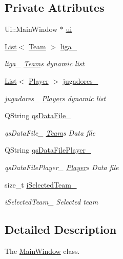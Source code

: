 \subsection*{Private Attributes}
\begin{DoxyCompactItemize}
\item 
Ui\+::\+Main\+Window $\ast$ \hyperlink{class_main_window_a35466a70ed47252a0191168126a352a5}{ui}
\item 
\hyperlink{class_list}{List}$<$ \hyperlink{class_team}{Team} $>$ \hyperlink{class_main_window_a5358b34e5fbb97d75dc06c61e7ae50fb}{liga\+\_\+}
\begin{DoxyCompactList}\small\item\em liga\+\_\+ \hyperlink{class_team}{Team}\textquotesingle{}s dynamic list \end{DoxyCompactList}\item 
\hyperlink{class_list}{List}$<$ \hyperlink{class_player}{Player} $>$ \hyperlink{class_main_window_aa0bb31955571995d85c4d9fda8bc9bbb}{jugadores\+\_\+}
\begin{DoxyCompactList}\small\item\em jugadores\+\_\+ \hyperlink{class_player}{Player}\textquotesingle{}s dynamic list \end{DoxyCompactList}\item 
Q\+String \hyperlink{class_main_window_accae73696fc981f52f13a1e51b411ccb}{qs\+Data\+File\+\_\+}
\begin{DoxyCompactList}\small\item\em qs\+Data\+File\+\_\+ \hyperlink{class_team}{Team}\textquotesingle{}s Data file \end{DoxyCompactList}\item 
Q\+String \hyperlink{class_main_window_aa4336777565d0c2a9ad6f0b96bc4c004}{qs\+Data\+File\+Player\+\_\+}
\begin{DoxyCompactList}\small\item\em qs\+Data\+File\+Player\+\_\+ \hyperlink{class_player}{Player}\textquotesingle{}s Data file \end{DoxyCompactList}\item 
size\+\_\+t \hyperlink{class_main_window_ab6d6da80222e139234012a2a39f72522}{i\+Selected\+Team\+\_\+}
\begin{DoxyCompactList}\small\item\em i\+Selected\+Team\+\_\+ Selected team \end{DoxyCompactList}\end{DoxyCompactItemize}


\subsection{Detailed Description}
The \hyperlink{class_main_window}{Main\+Window} class. 

